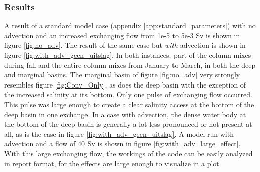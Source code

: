 \documentclass[twocolumn]{article}
\begin{document}
\subsubsection{Results}
A result of a standard model case (appendix \ref{app:standard_parameters}) with no advection and an increased exchanging flow from 1e-5 to 5e-3 Sv is shown in figure \ref{fig:no_adv}. The result of the same case but \textit{with} advection is shown in figure \ref{fig:with_adv_geen_uitslag}. In both instances, part of the column mixes during fall and the entire column mixes from January to March, in both the deep and marginal basins. The marginal basin of figure \ref{fig:no_adv} very strongly resembles figure \ref{fig:Conv_Only}, as does the deep basin with the exception of the increased salinity at its bottom. Only one pulse of exchanging flow occurred. This pulse was large enough to create a clear salinity access at the bottom of the deep basin in one exchange.
In a case with advection, the dense water body at the bottom of the deep basin is generally a lot less pronounced or not present at all, as is the case in figure \ref{fig:with_adv_geen_uitslag}. A model run with advection and a flow of 40 Sv is shown in figure \ref{fig:with_adv_large_effect}. With this large exchanging flow, the workings of the code can be easily analyzed in report format, for the effects are large enough to visualize in a plot.%


\end{document}
